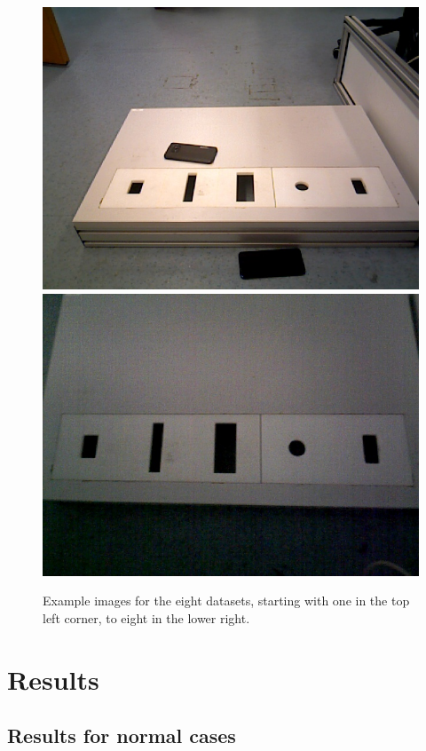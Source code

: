 \documentclass{article}
\begin{document}
\begin{figure}[h!]
\begin{minipage}{\textwidth}
\includegraphics[scale=0.15]{images/Seventh_set.jpg}
\includegraphics[scale=0.15]{images/Eigth_set.jpg}
\caption{Example images for the eight datasets, starting with one in the top left corner, to eight in the lower right.}
\label{fig:datasets}
\end{minipage}
\end{figure}

\section{Results}

\subsection{Results for normal cases}
\end{document}
